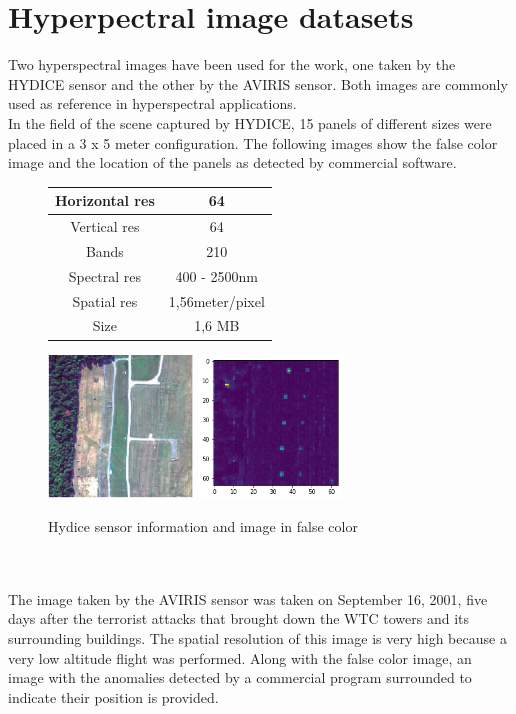 \section{Hyperpectral image datasets}
Two hyperspectral images have been used for the work, one taken by the HYDICE sensor and the other by the AVIRIS sensor. Both images are commonly used as reference in hyperspectral applications. 
\\
In the field of the scene captured by HYDICE, 15 panels of different sizes were placed in a 3 x 5 meter configuration. The following images show the false color image and the location of the panels as detected by commercial software.
\begin{figure}[!ht]
    \begin{tabular}[b]{c|c}\hline
      Horizontal res & 64 \\ \hline
      Vertical res & 64 \\ \hline
      Bands & 210 \\ \hline
      Spectral res & 400 - 2500nm \\ \hline
      Spatial res & 1,56meter/pixel \\ \hline
      Size & 1,6 MB\\ \hline
    \end{tabular}
\includegraphics[height=1.5in]{figures/hydice_bad.png}
\includegraphics[height=1.5in]{figures/hydice_rx.png}
    \caption{Hydice sensor information and image in false color}
  \end{figure}
\\
\\
The image taken by the AVIRIS sensor was taken on September 16, 2001, five days after the terrorist attacks that brought down the WTC towers and its surrounding buildings. The spatial resolution of this image is very high because a very low altitude flight was performed. Along with the false color image, an image with the anomalies detected by a commercial program surrounded to indicate their position is provided.
